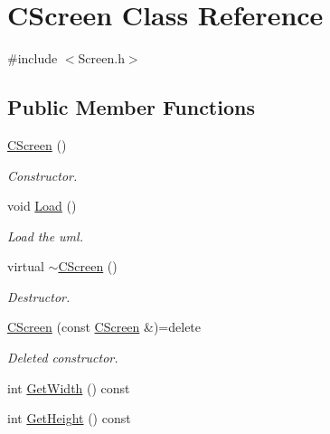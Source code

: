 \hypertarget{class_c_screen}{}\section{C\+Screen Class Reference}
\label{class_c_screen}


{\ttfamily \#include $<$Screen.\+h$>$}

\subsection*{Public Member Functions}
\begin{DoxyCompactItemize}
\item 
\mbox{\hyperlink{class_c_screen_ac2dfca02f82f6f2943ee601952bf5915}{C\+Screen}} ()
\begin{DoxyCompactList}\small\item\em Constructor. \end{DoxyCompactList}\item 
\mbox{\label{class_c_screen_a2d02802a101125358a8e74c1c9c9f762}} 
void \mbox{\hyperlink{class_c_screen_a2d02802a101125358a8e74c1c9c9f762}{Load}} ()
\begin{DoxyCompactList}\small\item\em Load the uml. \end{DoxyCompactList}\item 
\mbox{\label{class_c_screen_a7330032366cc5f03c66f627ccda222a6}} 
virtual \mbox{\hyperlink{class_c_screen_a7330032366cc5f03c66f627ccda222a6}{$\sim$\+C\+Screen}} ()
\begin{DoxyCompactList}\small\item\em Destructor. \end{DoxyCompactList}\item 
\mbox{\label{class_c_screen_ae6ee0263e8cd99293612076ed50974e0}} 
\mbox{\hyperlink{class_c_screen_ae6ee0263e8cd99293612076ed50974e0}{C\+Screen}} (const \mbox{\hyperlink{class_c_screen}{C\+Screen}} \&)=delete
\begin{DoxyCompactList}\small\item\em Deleted constructor. \end{DoxyCompactList}\item 
int \mbox{\hyperlink{class_c_screen_a592f32768220e63f75608945acd04751}{Get\+Width}} () const
\item 
int \mbox{\hyperlink{class_c_screen_a1bde3a61effc114f5d859b0ffb237b75}{Get\+Height}} () const

\end{DoxyCompactItemize}
